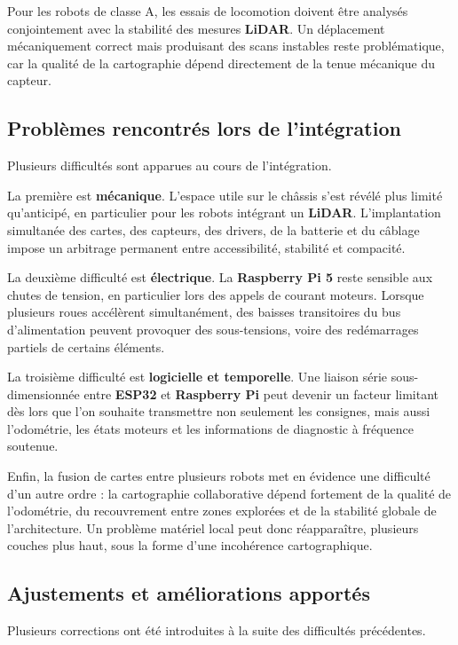 \documentclass[11pt,a4paper]{report}
\newcommand{\kw}[1]{\textbf{#1}}
\begin{document}
Pour les robots de classe A, les essais de locomotion doivent être analysés conjointement avec la stabilité des mesures \kw{LiDAR}. Un déplacement mécaniquement correct mais produisant des scans instables reste problématique, car la qualité de la cartographie dépend directement de la tenue mécanique du capteur.

\subsection{Problèmes rencontrés lors de l'intégration}

Plusieurs difficultés sont apparues au cours de l’intégration.

La première est \kw{mécanique}. L’espace utile sur le châssis s’est révélé plus limité qu’anticipé, en particulier pour les robots intégrant un \kw{LiDAR}. L’implantation simultanée des cartes, des capteurs, des drivers, de la batterie et du câblage impose un arbitrage permanent entre accessibilité, stabilité et compacité.

La deuxième difficulté est \kw{électrique}. La \kw{Raspberry Pi 5} reste sensible aux chutes de tension, en particulier lors des appels de courant moteurs. Lorsque plusieurs roues accélèrent simultanément, des baisses transitoires du bus d’alimentation peuvent provoquer des sous-tensions, voire des redémarrages partiels de certains éléments.

La troisième difficulté est \kw{logicielle et temporelle}. Une liaison série sous-dimensionnée entre \kw{ESP32} et \kw{Raspberry Pi} peut devenir un facteur limitant dès lors que l’on souhaite transmettre non seulement les consignes, mais aussi l’odométrie, les états moteurs et les informations de diagnostic à fréquence soutenue.

Enfin, la fusion de cartes entre plusieurs robots met en évidence une difficulté d’un autre ordre : la cartographie collaborative dépend fortement de la qualité de l’odométrie, du recouvrement entre zones explorées et de la stabilité globale de l’architecture. Un problème matériel local peut donc réapparaître, plusieurs couches plus haut, sous la forme d’une incohérence cartographique.

\subsection{Ajustements et améliorations apportés}

Plusieurs corrections ont été introduites à la suite des difficultés précédentes.
\end{document}
